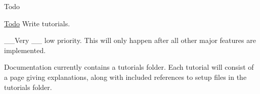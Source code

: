 \begin{DoxyRefDesc}{Todo}
\item[\hyperlink{todo__todo000036}{Todo}]Write tutorials.
\begin{DoxyItemize}
\item \-\_\-\-\_\-\-Very \-\_\-\-\_\- low priority. This will only happen after all other major features are implemented.
\end{DoxyItemize}\end{DoxyRefDesc}


Documentation currently contains a tutorials folder. Each tutorial will consist of a page giving explanations, along with included references to setup files in the tutorials folder. 
